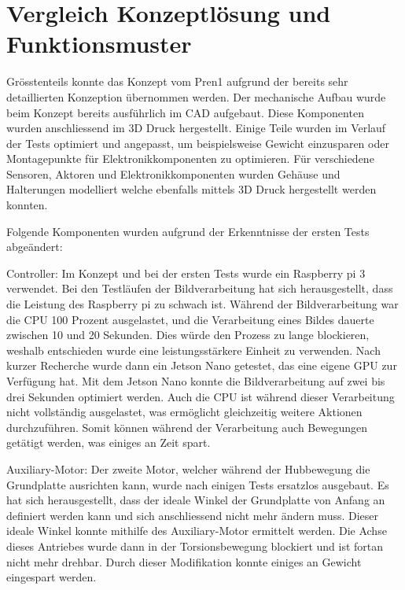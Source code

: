 \newpage

\section{Vergleich Konzeptlösung und Funktionsmuster}
Grösstenteils konnte das Konzept vom Pren1 aufgrund der bereits sehr detaillierten Konzeption übernommen werden. Der mechanische Aufbau wurde beim Konzept bereits ausführlich im CAD aufgebaut. Diese Komponenten wurden anschliessend im 3D Druck hergestellt. Einige Teile wurden im Verlauf der Tests optimiert und angepasst, um beispielsweise Gewicht einzusparen oder Montagepunkte für Elektronikkomponenten zu optimieren.
Für verschiedene Sensoren, Aktoren und Elektronikkomponenten wurden Gehäuse und Halterungen modelliert welche ebenfalls mittels 3D Druck hergestellt werden konnten.

Folgende Komponenten wurden aufgrund der Erkenntnisse der ersten Tests abgeändert:

Controller:
Im Konzept und bei der ersten Tests wurde ein Raspberry pi 3 verwendet. Bei den Testläufen der Bildverarbeitung hat sich herausgestellt, dass die Leistung des Raspberry pi zu schwach ist. Während der Bildverarbeitung war die CPU 100 Prozent ausgelastet, und die Verarbeitung eines Bildes dauerte zwischen 10 und 20 Sekunden. Dies würde den Prozess zu lange blockieren, weshalb entschieden wurde eine leistungsstärkere Einheit zu verwenden. 
Nach kurzer Recherche wurde dann ein Jetson Nano getestet, das eine eigene GPU zur Verfügung hat. Mit dem Jetson Nano konnte die Bildverarbeitung auf zwei bis drei Sekunden optimiert werden. Auch die CPU ist während dieser Verarbeitung nicht vollständig ausgelastet, was ermöglicht gleichzeitig weitere Aktionen durchzuführen. Somit können während der Verarbeitung auch Bewegungen getätigt werden, was einiges an Zeit spart.

Auxiliary-Motor:
Der zweite Motor, welcher während der Hubbewegung die Grundplatte ausrichten kann, wurde nach einigen Tests ersatzlos ausgebaut. Es hat sich herausgestellt, dass der ideale Winkel der Grundplatte von Anfang an definiert werden kann und sich anschliessend nicht mehr ändern muss. Dieser ideale Winkel konnte mithilfe des Auxiliary-Motor ermittelt werden. Die Achse dieses Antriebes wurde dann in der Torsionsbewegung blockiert und ist fortan nicht mehr drehbar.
Durch dieser Modifikation konnte einiges an Gewicht eingespart werden. 

